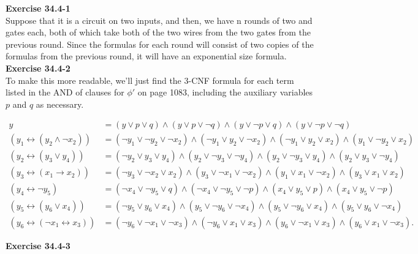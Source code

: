 \documentclass{article}
\begin{document}
\noindent\textbf{Exercise 34.4-1}\\

Suppose that it is a circuit on two inputs, and then, we have n rounds of two and gates each, both of which take both of the two wires from the two gates from the previous round. Since the formulas for each round will consist of two copies of the formulas from the previous round, it will have an exponential size formula.\\

\noindent\textbf{Exercise 34.4-2}\\

To make this more readable, we'll just find the 3-CNF formula for each term listed in the AND of clauses for $\phi'$ on page 1083, including the auxiliary variables $p$ and $q$ as necessary.

\begin{align*}
y &= (y \vee p \vee q) \wedge (y \vee p \vee \neg q) \wedge (y \vee \neg p \vee q) \wedge (y \vee \neg p \vee \neg q) \\
(y_1 \leftrightarrow (y_2 \wedge \neg x_2)) &= (\neg y_1 \vee \neg y_2 \vee \neg x_2) \wedge (\neg y_1 \vee y_2 \vee \neg x_2) \wedge (\neg y_1 \vee y_2 \vee x_2) \wedge (y_1 \vee \neg y_2 \vee x_2)\\
(y_2 \leftrightarrow (y_3 \vee y_4)) &= (\neg y_2 \vee y_3 \vee y_4) \wedge (y_2 \vee \neg y_3 \vee \neg y_4) \wedge (y_2 \vee \neg y_3 \vee y_4) \wedge (y_2 \vee y_3 \vee \neg y_4)\\
(y_3 \leftrightarrow (x_1 \rightarrow x_2)) &= (\neg y_3 \vee \neg x_2 \vee x_2) \wedge (y_3 \vee \neg x_1 \vee \neg x_2) \wedge  (y_1 \vee x_1 \vee \neg x_2) \wedge (y_3 \vee x_1 \vee x_2) \\
(y_4 \leftrightarrow \neg y_5) &= (\neg x_4 \vee \neg y_5 \vee q) \wedge (\neg x_4 \vee \neg y_5 \vee \neg p) \wedge (x_4 \vee y_5 \vee p) \wedge (x_4 \vee y_5 \vee \neg p)\\
(y_5 \leftrightarrow (y_6 \vee x_4)) &= (\neg y_5 \vee y_6 \vee x_4) \wedge (y_5 \vee \neg y_6 \vee \neg x_4) \wedge (y_5 \vee \neg y_6 \vee x_4) \wedge (y_5 \vee y_6 \vee \neg x_4)\\
(y_6 \leftrightarrow (\neg x_1 \leftrightarrow x_3)) &= (\neg y_6 \vee \neg x_1 \vee \neg x_3) \wedge (\neg y_6 \vee x_1 \vee x_3) \wedge (y_6 \vee \neg x_1 \vee x_3) \wedge (y_6 \vee x_1 \vee \neg x_3).
\end{align*}

\noindent\textbf{Exercise 34.4-3}\\
\end{document}
